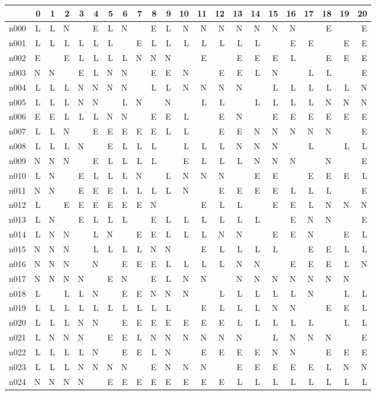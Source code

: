 {\scriptsize
\begin{tabular}{l*{21}{r}} \toprule
& 0& 1& 2& 3& 4& 5& 6& 7& 8& 9& 10& 11& 12& 13& 14& 15& 16& 17& 18& 19& 20\\ \midrule 
n000& L& L& N& & E& L& N& & E& L& N& N& N& N& N& N& N& & E& & E\\ 
n001& L& L& L& L& L& L& & E& L& L& L& L& L& L& L& & E& E& & E& E\\ 
n002& E& & E& L& L& L& L& N& N& N& & E& & E& E& E& L& & E& E& E\\ 
n003& N& N& & E& L& N& N& & E& E& N& & E& E& L& N& & L& L& & E\\ 
n004& L& L& L& N& N& N& N& & L& L& N& N& N& N& & L& L& L& L& L& N\\ 
n005& L& L& L& N& N& & L& N& & N& & L& L& & L& L& L& L& N& N& N\\ 
n006& E& E& L& L& L& N& N& & E& E& L& & E& N& & E& E& E& E& E& E\\ 
n007& L& L& N& & E& E& E& E& E& L& L& & E& E& N& N& N& N& N& & E\\ 
n008& L& L& L& N& & E& L& L& L& & L& L& L& N& N& N& & L& & L& L\\ 
n009& N& N& N& & E& L& L& L& L& & E& L& L& L& N& N& N& & N& & E\\ 
n010& L& N& & E& L& L& L& N& & L& N& N& N& & E& E& & E& E& E& L\\ 
n011& N& N& & E& E& E& L& L& L& L& N& & E& E& E& E& L& L& L& & E\\ 
n012& L& & E& E& E& E& E& E& N& & & E& L& L& & E& E& L& N& N& N\\ 
n013& L& N& & E& L& L& L& & E& L& L& L& L& L& L& & E& N& N& & E\\ 
n014& L& N& N& & L& N& & E& E& L& L& L& N& N& & E& E& N& & E& L\\ 
n015& N& N& N& & L& L& L& L& N& N& & E& L& L& L& L& & E& E& L& L\\ 
n016& N& N& N& & N& & E& E& E& L& L& L& L& N& N& & E& E& E& L& N\\ 
n017& N& N& N& N& & E& N& & E& L& N& N& & N& N& N& N& N& N& N& \\ 
n018& L& & L& L& N& & E& E& N& N& N& & L& L& L& L& L& N& & L& L\\ 
n019& L& L& L& L& L& L& L& L& L& L& & E& L& L& L& N& N& & E& E& L\\ 
n020& L& L& L& N& N& & E& E& E& E& E& E& E& L& L& L& L& L& & L& L\\ 
n021& L& N& N& N& & E& E& L& N& N& N& N& N& N& & L& N& N& N& & E\\ 
n022& L& L& L& L& N& & E& E& L& N& & E& E& E& E& N& N& & E& E& E\\ 
n023& L& L& L& N& N& N& N& & E& N& N& N& & E& E& E& E& E& L& N& N\\ 
n024& N& N& N& N& & E& E& E& E& E& E& E& E& L& L& L& L& L& L& L& L\\ 
\bottomrule
\end{tabular}
}
